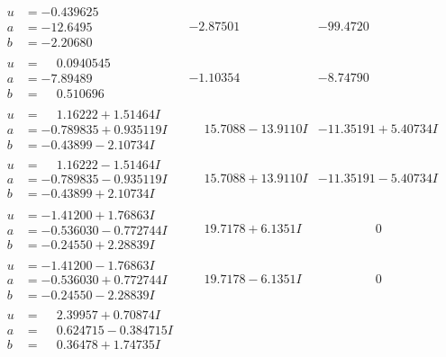 \documentclass[1p]{elsarticle_modified}
\theoremstyle{definition}
\begin{document}
$$\begin{array}{c|c|c}
\begin{aligned}
u &= -0.439625\phantom{ +0.000000I} \\
a &= -12.6495\phantom{ +0.000000I} \\
b &= -2.20680\phantom{ +0.000000I}\end{aligned}
 & -2.87501\phantom{ +0.000000I} & -99.4720\phantom{ +0.000000I} \\ \hline\begin{aligned}
u &= \phantom{-}0.0940545\phantom{ +0.000000I} \\
a &= -7.89489\phantom{ +0.000000I} \\
b &= \phantom{-}0.510696\phantom{ +0.000000I}\end{aligned}
 & -1.10354\phantom{ +0.000000I} & -8.74790\phantom{ +0.000000I} \\ \hline\begin{aligned}
u &= \phantom{-}1.16222 + 1.51464 I \\
a &= -0.789835 + 0.935119 I \\
b &= -0.43899 - 2.10734 I\end{aligned}
 & \phantom{-}15.7088 - 13.9110 I & -11.35191 + 5.40734 I \\ \hline\begin{aligned}
u &= \phantom{-}1.16222 - 1.51464 I \\
a &= -0.789835 - 0.935119 I \\
b &= -0.43899 + 2.10734 I\end{aligned}
 & \phantom{-}15.7088 + 13.9110 I & -11.35191 - 5.40734 I \\ \hline\begin{aligned}
u &= -1.41200 + 1.76863 I \\
a &= -0.536030 - 0.772744 I \\
b &= -0.24550 + 2.28839 I\end{aligned}
 & \phantom{-}19.7178 + 6.1351 I & \phantom{-0.000000 } 0 \\ \hline\begin{aligned}
u &= -1.41200 - 1.76863 I \\
a &= -0.536030 + 0.772744 I \\
b &= -0.24550 - 2.28839 I\end{aligned}
 & \phantom{-}19.7178 - 6.1351 I & \phantom{-0.000000 } 0 \\ \hline\begin{aligned}
u &= \phantom{-}2.39957 + 0.70874 I \\
a &= \phantom{-}0.624715 - 0.384715 I \\
b &= \phantom{-}0.36478 + 1.74735 I\end{aligned}

\end{array}$$
\end{document}
